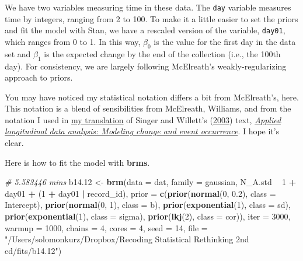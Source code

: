 \documentclass[]{article}
\newenvironment{Shaded}{\begin{snugshade}}{\end{snugshade}}
\newcommand{\CommentTok}[1]{\textcolor[rgb]{0.56,0.35,0.01}{\textit{#1}}}
\newcommand{\DataTypeTok}[1]{\textcolor[rgb]{0.13,0.29,0.53}{#1}}
\newcommand{\DecValTok}[1]{\textcolor[rgb]{0.00,0.00,0.81}{#1}}
\newcommand{\FloatTok}[1]{\textcolor[rgb]{0.00,0.00,0.81}{#1}}
\newcommand{\KeywordTok}[1]{\textcolor[rgb]{0.13,0.29,0.53}{\textbf{#1}}}
\newcommand{\NormalTok}[1]{#1}
\newcommand{\OperatorTok}[1]{\textcolor[rgb]{0.81,0.36,0.00}{\textbf{#1}}}
\newcommand{\StringTok}[1]{\textcolor[rgb]{0.31,0.60,0.02}{#1}}
\begin{document}
We have two variables measuring time in these data. The \texttt{day}
variable measures time by integers, ranging from 2 to 100. To make it a
little easier to set the priors and fit the model with Stan, we have a
rescaled version of the variable, \texttt{day01}, which ranges from 0 to
1. In this way, \(\beta_0\) is the value for the first day in the data
set and \(\beta_1\) is the expected change by the end of the collection
(i.e., the 100th day). For consistency, we are largely following
McElreath's weakly-regularizing approach to priors.

You may have noticed my statistical notation differs a bit from
McElreath's, here. This notation is a blend of sensibilities from
McElreath, Williams, and from the notation I used in
\href{https://bookdown.org/content/4253/}{my translation} of Singer and
Willett's
(\protect\hyperlink{ref-singerAppliedLongitudinalData2003}{2003}) text,
\href{https://oxford.universitypressscholarship.com/view/10.1093/acprof:oso/9780195152968.001.0001/acprof-9780195152968}{\emph{Applied
longitudinal data analysis: Modeling change and event occurrence}}. I
hope it's clear.

Here is how to fit the model with \textbf{brms}.

\begin{Shaded}
\begin{Highlighting}[]
\CommentTok{# 5.583446 mins}
\NormalTok{b14}\FloatTok{.12}\NormalTok{ <-}
\StringTok{  }\KeywordTok{brm}\NormalTok{(}\DataTypeTok{data =}\NormalTok{ dat,}
      \DataTypeTok{family =}\NormalTok{ gaussian,}
\NormalTok{      N_A.std }\OperatorTok{~}\StringTok{ }\DecValTok{1} \OperatorTok{+}\StringTok{ }\NormalTok{day01 }\OperatorTok{+}\StringTok{ }\NormalTok{(}\DecValTok{1} \OperatorTok{+}\StringTok{ }\NormalTok{day01 }\OperatorTok{|}\StringTok{ }\NormalTok{record_id),}
      \DataTypeTok{prior =} \KeywordTok{c}\NormalTok{(}\KeywordTok{prior}\NormalTok{(}\KeywordTok{normal}\NormalTok{(}\DecValTok{0}\NormalTok{, }\FloatTok{0.2}\NormalTok{), }\DataTypeTok{class =}\NormalTok{ Intercept),}
                \KeywordTok{prior}\NormalTok{(}\KeywordTok{normal}\NormalTok{(}\DecValTok{0}\NormalTok{, }\DecValTok{1}\NormalTok{), }\DataTypeTok{class =}\NormalTok{ b),}
                \KeywordTok{prior}\NormalTok{(}\KeywordTok{exponential}\NormalTok{(}\DecValTok{1}\NormalTok{), }\DataTypeTok{class =}\NormalTok{ sd),}
                \KeywordTok{prior}\NormalTok{(}\KeywordTok{exponential}\NormalTok{(}\DecValTok{1}\NormalTok{), }\DataTypeTok{class =}\NormalTok{ sigma),}
                \KeywordTok{prior}\NormalTok{(}\KeywordTok{lkj}\NormalTok{(}\DecValTok{2}\NormalTok{), }\DataTypeTok{class =}\NormalTok{ cor)),}
      \DataTypeTok{iter =} \DecValTok{3000}\NormalTok{, }\DataTypeTok{warmup =} \DecValTok{1000}\NormalTok{, }\DataTypeTok{chains =} \DecValTok{4}\NormalTok{, }\DataTypeTok{cores =} \DecValTok{4}\NormalTok{,}
      \DataTypeTok{seed =} \DecValTok{14}\NormalTok{,}
      \DataTypeTok{file =} \StringTok{"/Users/solomonkurz/Dropbox/Recoding Statistical Rethinking 2nd ed/fits/b14.12"}\NormalTok{)}
\end{Highlighting}
\end{Shaded}
\end{document}
